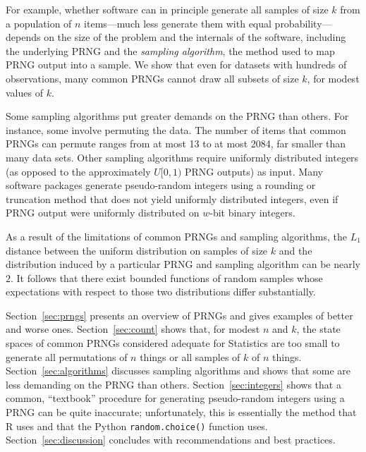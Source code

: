 \documentclass[graybox]{svmult}
\begin{document}
For example, whether software can in principle generate all samples of size $k$ from a population of
$n$ items---much less generate them with equal probability---depends on the size of the problem and the internals of the software, including the underlying PRNG and the \emph{sampling algorithm},
the method used to map PRNG output into a sample.
We show that even for datasets with hundreds of observations, 
many common PRNGs cannot draw all subsets of size $k$, for modest values of $k$.

Some sampling algorithms put greater demands on the PRNG than others.
For instance, some involve permuting the data.
The number of items that common PRNGs can permute ranges from at most 13 to at most 2084, far smaller than many data sets.
Other sampling algorithms require uniformly distributed integers (as opposed to the approximately $U[0,1)$ PRNG outputs) as input.
Many software packages generate
pseudo-random integers using a rounding or truncation method that does not yield uniformly distributed integers, even
if PRNG output were uniformly distributed on $w$-bit binary integers.

As a result of the limitations of common PRNGs and sampling algorithms,
the $L_1$ distance between the uniform distribution on samples of
size $k$ and the distribution induced by a particular PRNG and sampling algorithm can be nearly $2$.
It follows that there exist bounded functions of random samples whose expectations with respect to those two distributions differ substantially. 

Section~\ref{sec:prngs} presents an overview of PRNGs and gives examples of better and worse ones.
Section~\ref{sec:count} shows that, for modest $n$ and $k$, the state spaces of common PRNGs considered adequate for Statistics are too small to generate all permutations of 
$n$ things or all samples of $k$ of $n$ things. 
Section~\ref{sec:algorithms} discusses sampling algorithms and shows that some are less demanding on the PRNG than others. 
Section~\ref{sec:integers} shows that a common, ``textbook'' procedure for generating pseudo-random integers using a PRNG can be quite inaccurate; unfortunately, this is essentially the method that R uses
and that the Python \texttt{random.choice()} function uses.
Section~\ref{sec:discussion} concludes with recommendations and best practices.
\end{document}
